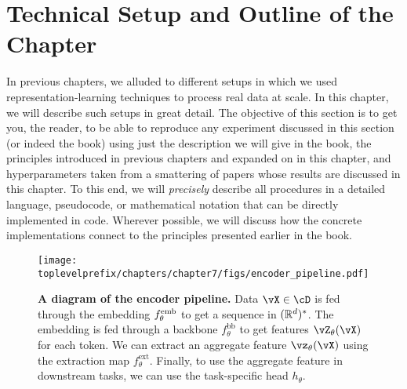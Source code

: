 \documentclass[../../book-main.tex]{subfiles}
\begin{document}



\section{Technical Setup and Outline of the Chapter}\label{sec:experiment_setup}

In previous chapters, we alluded to different setups in which we used representation-learning techniques to process real data at scale. In this chapter, we will describe such setups in great detail. The objective of this section is to get you, the reader, to be able to reproduce any experiment discussed in this section (or indeed the book) using just the description we will give in the book, the principles introduced in previous chapters and expanded on in this chapter, and hyperparameters taken from a smattering of papers whose results are discussed in this chapter. To this end, we will \textit{precisely} describe all procedures in a detailed language, pseudocode, or mathematical notation that can be directly implemented in code. Wherever possible, we will discuss how the concrete implementations connect to the principles presented earlier in the book.

\begin{figure}
    \texttt{[image: \\toplevelprefix/chapters/chapter7/figs/encoder\_pipeline.pdf]}
    \caption{\small\textbf{A diagram of the encoder pipeline.} Data \(\vX \in \cD\) is fed through the embedding \(f_{\theta}^{\mathrm{emb}}\) to get a sequence in \((\mathbb{R}^{d})^{*}\). The embedding is fed through a backbone \(f_{\theta}^{\mathrm{bb}}\) to get features \(\vZ_{\theta}(\vX)\) for each token. We can extract an aggregate feature \(\vz_{\theta}(\vX)\) using the extraction map \(f_{\theta}^{\mathrm{ext}}\). Finally, to use the aggregate feature in downstream tasks, we can use the task-specific head \(h_{\theta}\).}
    \label{fig:overall_encoder_pipeline}
\end{figure}
\end{document}
